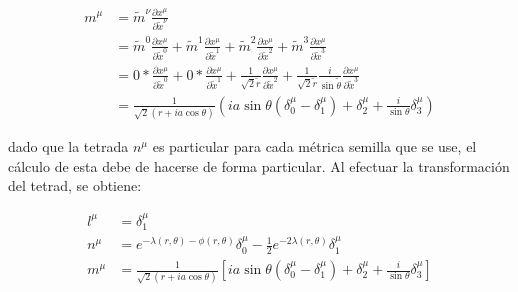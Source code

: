 \begin{enumerate}[1.]
          \begin{equation}
              \begin{aligned}
                  m^\mu & = \tilde{m}^\nu \frac{\partial x^\mu}{\partial \tilde{x}^\nu}                                                                                                                                                                                                                           \\
                        & = \tilde{m}^0 \frac{\partial x^\mu}{\partial \tilde{x}^0} + \tilde{m}^1 \frac{\partial x^\mu}{\partial \tilde{x}^1} + \tilde{m}^2 \frac{\partial x^\mu}{\partial \tilde{x}^2} + \tilde{m}^3 \frac{\partial x^\mu}{\partial \tilde{x}^3}                                                 \\
                        & = 0 * \frac{\partial x^\mu}{\partial \tilde{x}^0} + 0 * \frac{\partial x^\mu}{\partial \tilde{x}^1} + \frac{1}{\sqrt{2} \tilde{r}} \frac{\partial x^\mu}{\partial \tilde{x}^2} + \frac{1}{\sqrt{2} \tilde{r}} \frac{i}{\sin \tilde{\theta}} \frac{\partial x^\mu}{\partial \tilde{x}^3} \\
                        & = \frac{1}{\sqrt{2}(r + ia \cos \theta)} \left( ia \sin \theta (\delta_0^\mu - \delta_1^\mu) + \delta_2^\mu + \frac{i}{\sin \theta} \delta_3^\mu \right)
              \end{aligned}
          \end{equation}

          dado que la tetrada $n^\mu$ es particular para cada métrica semilla que se use, el cálculo de esta debe de hacerse de forma particular. Al efectuar la transformación del tetrad, se obtiene:

          \begin{equation}
              \begin{aligned}
                  l^\mu & = \delta_1^\mu                                                                                                                                           \\
                  n^\mu & = e^{-\lambda(r, \theta) - \phi(r, \theta)} \delta_0^\mu - \frac{1}{2} e^{-2 \lambda(r, \theta)} \delta_1^\mu                                            \\
                  m^\mu & = \frac{1}{\sqrt{2}(r + ia \cos \theta)} \left[ ia \sin \theta (\delta_0^\mu - \delta_1^\mu) + \delta_2^\mu + \frac{i}{\sin \theta} \delta_3^\mu \right]
              \end{aligned}
          \end{equation}


\end{enumerate}
